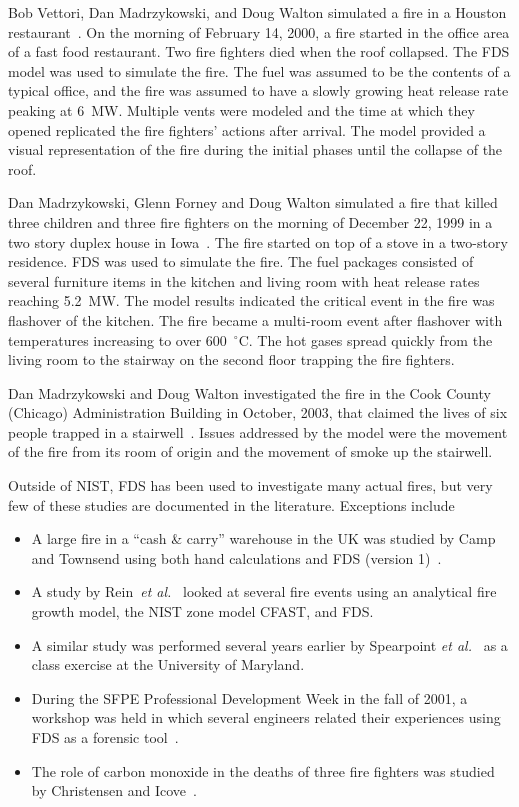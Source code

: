 Bob Vettori, Dan Madrzykowski, and Doug Walton simulated a fire in a Houston restaurant~\cite{Texas}. On the morning of February 14, 2000, a fire started in the
office area of a fast food restaurant. Two fire fighters died when the roof collapsed. The FDS model was used to simulate the fire. The fuel was
assumed to be the contents of a typical office, and the fire was assumed to have a slowly growing heat release rate peaking at 6~MW. Multiple vents
were modeled and the time at which they opened replicated the fire fighters' actions after arrival.  The model provided a visual representation of
the fire during the initial phases until the collapse of the roof.

Dan Madrzykowski, Glenn Forney and Doug Walton simulated a fire that killed three children and three fire fighters on the morning of December 22, 1999 in a
two story duplex house in Iowa~\cite{Iowa}. The fire started on top of a stove in a two-story residence. FDS was used to simulate the fire.
The fuel packages consisted of several furniture items
in the kitchen and living room with heat release rates reaching 5.2~MW. The model results indicated the critical event in the fire was flashover of
the kitchen. The fire became a multi-room event after flashover with temperatures increasing to over 600~$^\circ$C. The hot gases spread quickly from
the living room to the stairway on the second floor trapping the fire fighters.

Dan Madrzykowski and Doug Walton investigated the fire in the Cook County (Chicago) Administration Building in October, 2003, that claimed the lives of six people trapped
in a stairwell~\cite{Cook_County}. Issues addressed by the model were the movement of the fire from its room of origin and the movement of smoke up the stairwell.

Outside of NIST, FDS has been used to investigate many actual fires, but very few of these studies are documented in the literature. Exceptions
include
\begin{itemize}
\item A large fire in a ``cash \& carry'' warehouse in the UK was studied by Camp and Townsend using both hand calculations and FDS (version 1)~\cite{Camp:Interflam2001}.
\item A study by Rein~{\em et al.}~\cite{Rein:Interflam2004} looked at several fire events using an analytical fire growth model, the NIST zone
model CFAST, and FDS.
\item A similar study was performed several years earlier by Spearpoint {\em et al.}~\cite{Spearpoint:ICFRE3} as a class exercise at
the University of Maryland.
\item During the SFPE Professional Development Week in the fall of 2001, a workshop was held in which several engineers related
their experiences using FDS as a forensic tool~\cite{Carpenter:SFPE2001}.
\item The role of carbon monoxide in the deaths of three fire fighters was studied by Christensen and Icove~\cite{Christensen:JFS}.
\end{itemize}
